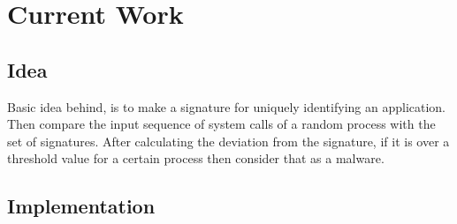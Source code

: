 \section{Current Work}

\subsection{Idea}
Basic idea behind, is to make a signature for uniquely identifying an application. Then compare the input sequence of system calls of a random process with the set of signatures. After calculating the deviation from the signature, if it is over a threshold value for a certain process then consider that as a malware.

\subsection{Implementation}
